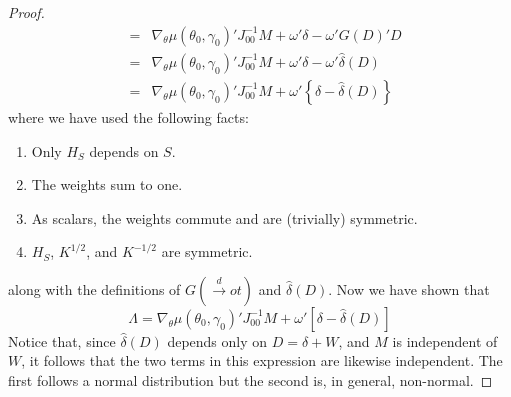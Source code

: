 \documentclass[12pt]{article}
\theoremstyle{definition}
\begin{document}
\begin{proof}
\begin{eqnarray*}
			&=&\nabla_{\theta}\mu(\theta_0, \gamma_0)'J_{00}^{-1}M+  \omega'\delta - \omega 'G(D)'D \\
			&=&\nabla_{\theta}\mu(\theta_0, \gamma_0)'J_{00}^{-1}M+  \omega'\delta - \omega' \hat{\delta}(D)\\
			&=&\nabla_{\theta}\mu(\theta_0, \gamma_0)'J_{00}^{-1}M+  \omega'\left\{\delta - \hat{\delta}(D)\right\}
\end{eqnarray*}
where we have used the following facts:
	\begin{enumerate}
		\item Only $H_S$ depends on $S$.
		\item The weights sum to one.
		\item As scalars, the weights commute and are (trivially) symmetric.
		\item $H_S$, $K^{1/2}$, and $K^{-1/2}$ are symmetric.
	\end{enumerate}
along with the definitions of $G(\overset{d}{\rightarrow}ot)$ and $\hat{\delta}(D)$. Now we have shown that
	$$
\Lambda = \nabla_\theta \mu(\theta_0,\gamma_0)' J_{00}^{-1} M + \omega' \left[\delta - \hat{\delta}(D) \right] 
$$
Notice that, since $\hat{\delta}(D)$ depends only on $D = \delta + W$, and $M$ is independent of $W$, it follows that the two terms in this expression are likewise independent. The first follows a normal distribution but the second is, in general, non-normal.


\end{proof}
\end{document}
